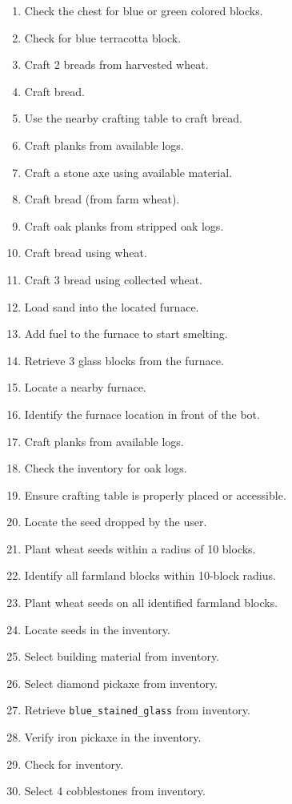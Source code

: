 \begin{small}
\begin{enumerate}
  \item Check the chest for blue or green colored blocks.
  \item Check for blue terracotta block.
  \item Craft 2 breads from harvested wheat.
  \item Craft bread.
  \item Use the nearby crafting table to craft bread.
  \item Craft planks from available logs.
  \item Craft a stone axe using available material.
  \item Craft bread (from farm wheat).
  \item Craft oak planks from stripped oak logs.
  \item Craft bread using wheat.
  \item Craft 3 bread using collected wheat.
  \item Load sand into the located furnace.
  \item Add fuel to the furnace to start smelting.
  \item Retrieve 3 glass blocks from the furnace.
  \item Locate a nearby furnace.
  \item Identify the furnace location in front of the bot.
  \item Craft planks from available logs.
  \item Check the inventory for oak logs.
  \item Ensure crafting table is properly placed or accessible.
  \item Locate the seed dropped by the user.
  \item Plant wheat seeds within a radius of 10 blocks.
  \item Identify all farmland blocks within 10-block radius.
  \item Plant wheat seeds on all identified farmland blocks.
  \item Locate seeds in the inventory.
  \item Select building material from inventory.
  \item Select diamond pickaxe from inventory.
  \item Retrieve \texttt{blue\_stained\_glass} from inventory.
  \item Verify iron pickaxe in the inventory.
  \item Check for inventory.
  \item Select 4 cobblestones from inventory.

\end{enumerate}
\end{small}
